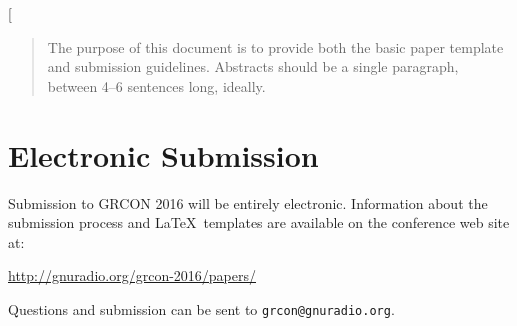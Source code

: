 \documentclass{article}
\begin{document}
 

\twocolumn[



\vskip 0.3in


\begin{abstract} 
The purpose of this document is to provide both the basic paper template and submission guidelines. 
Abstracts should be a single paragraph, between 4--6 sentences long, ideally. 
\end{abstract} 

\section{Electronic Submission}
\label{submission}

Submission to GRCON 2016 will be entirely electronic.  
Information about the submission process and \LaTeX\ templates
are available on the conference web site at:

\begin{center}
\url{http://gnuradio.org/grcon-2016/papers/}
\end{center}

Questions and submission can be sent to 
\texttt{grcon@gnuradio.org}.
\end{document}
